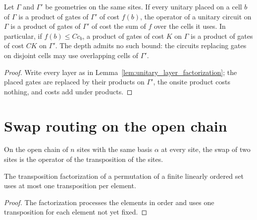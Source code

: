 \begin{theorem}
    \label{thm:unitary_gate_substitution}
    \leanok
    Let $\Gamma$ and $\Gamma'$ be geometries on the same sites. If every unitary placed on a
    cell $b$ of $\Gamma$ is a product of gates of $\Gamma'$ of cost $f(b)$, the operator of a
    unitary circuit on $\Gamma$ is a product of gates of $\Gamma'$ of cost the sum of $f$ over
    the cells it uses. In particular, if $f(b)\le Cc_b$, a product of gates of cost $K$ on
    $\Gamma$ is a product of gates of cost $CK$ on $\Gamma'$. The depth admits no such bound:
    the circuits replacing gates on disjoint cells may use overlapping cells of $\Gamma'$.
\end{theorem}
\begin{proof}\leanok
    Write every layer as in Lemma~\ref{lem:unitary_layer_factorization}; the placed gates are
    replaced by their products on $\Gamma'$, the onsite product costs nothing, and costs add
    under products.
\end{proof}

\section{Swap routing on the open chain}
\label{sec:unitary_swap_routing}

On the open chain of $n$ sites with the same basis $\alpha$ at every site, the swap
of two sites is the operator of the transposition of the sites.

\begin{lemma}
    \label{lem:unitary_swap_factors}
    \leanok
    The transposition factorization of a permutation of a finite linearly ordered set uses
    at most one transposition per element.
\end{lemma}
\begin{proof}\leanok
    The factorization processes the elements in order and uses one transposition for each
    element not yet fixed.
\end{proof}

